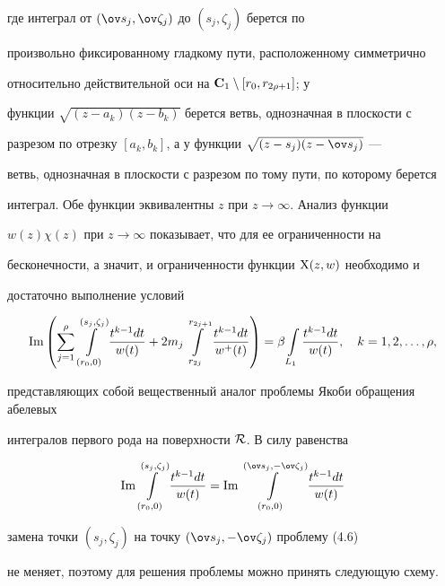 где интеграл от $(\ov s_j,\ov \zeta_j)$ до $(s_j,\zeta_j)$ берется по 


произвольно фиксированному гладкому пути, расположенному симметрично 


относительно действительной оси на $\bold C_1\setminus[r_0,r_{2\rho+1}]$; у 


функции $\sqrt{(z-a_k)(z-b_k)}$ берется ветвь, однозначная в плоскости с 


разрезом по отрезку $[a_k,b_k]$, а у функции $\sqrt{(z-s_j)(z-\ov s_j)}$ --- 


ветвь, однозначная в плоскости с разрезом по тому пути, по которому берется 


интеграл. Обе функции эквивалентны $z$ при $z\to\infty$. Анализ функции 


$w(z)\chi(z)$ при $z\to\infty$ показывает, что для ее ограниченности на 


бесконечности, а значит, и ограниченности функции $\mathrm X(z,w)$ необходимо и 


достаточно выполнение условий 


\begin{equation} 


\im\left(\sum^\rho_{j=1}\int\limits^{(s_j,\zeta_j)}_{(r_0,0)} 


\frac{t^{k-1}dt}{w(t)}+2m_j 


\int\limits^{r_{2j+1}}_{r_{2j}}\frac{t^{k-1}dt}{w^+(t)}\right)= 


\beta\int\limits_{L_1}\frac{t^{k-1}dt}{w(t)},\quad k=1,2,\dotsc,\rho, 


\end{equation} 


представляющих собой вещественный аналог проблемы Якоби обращения абелевых 


интегралов первого рода на поверхности $\cal R$. В силу равенства 


$$ 


\im\int\limits^{(s_j,\zeta_j)}_{(r_0,0)}\frac{t^{k-1}dt}{w(t)}= 


\im\int\limits^{(\ov s_j,-\ov \zeta_j)}_{(r_0,0)} 


\frac{t^{k-1}dt}{w(t)} 


$$ 


замена точки $(s_j,\zeta_j)$ на точку $(\ov s_j,-\ov\zeta_j)$ проблему (4.6) 


не меняет, поэтому для решения проблемы можно принять следующую схему. 


 


